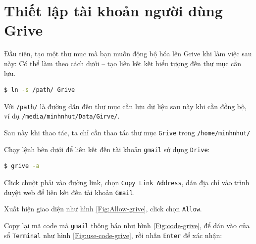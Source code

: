 \section{Thiết lập tài khoản người dùng Grive}\label{Sec:setting-grive}
\begin{list}{--}{}
\item Đầu tiên, tạo một thư mục mà bạn muốn động bộ hóa lên Grive khi làm việc sau này: Có thể làm theo cách dưới -- tạo liên kết kết biểu tượng đến thư mục cần lưu.
\begin{lstlisting}[language=bash]
$ ln -s /path/ Grive
\end{lstlisting}
\begin{list}{+}{}
\item Với \verb|/path/| là đường dẫn đến thư mục cần lưu dữ liệu sau này khi cần đồng bộ, ví dụ \verb|/media/minhnhut/Data/Girve/|. %
\item Sau này khi thao tác, ta chỉ cần thao tác thư mục \verb|Grive| trong \verb|/home/minhnhut/|
\end{list}
\item Chạy lệnh bên dưới để liên kết đến tài khoản \verb|gmail| sử dụng \verb|Drive|: 
\begin{lstlisting}[language=bash]
$ grive -a
\end{lstlisting}
\begin{list}{+}{}
\item Click chuột phải vào đường link, chọn \verb|Copy Link Address|, dán địa chỉ vào trình duyệt web để liên kết đến tài khoản \verb|Gmail|.
\item Xuất hiện giao diện như hình \ref{Fig:Allow-grive}, click chọn \verb|Allow|.
\item Copy lại mã code mà \verb|gmail| thông báo như hình \ref{Fig:code-grive}, để dán vào của sổ \verb|Terminal| như hình \ref{Fig:use-code-grive}, rồi nhấn \verb|Enter| để xác nhận:
\begin{figure}[!h]
\begin{center}

\end{center}
\end{figure}
\end{list}
\end{list}
